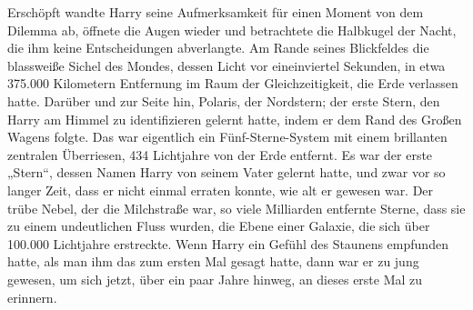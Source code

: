 Erschöpft wandte Harry seine Aufmerksamkeit für einen Moment von dem Dilemma ab, öffnete die Augen wieder und betrachtete die Halbkugel der Nacht, die ihm keine Entscheidungen abverlangte.
Am Rande seines Blickfeldes die blassweiße Sichel des Mondes, dessen Licht vor eineinviertel Sekunden, in etwa 375.000 Kilometern Entfernung im Raum der Gleichzeitigkeit, die Erde verlassen hatte.
Darüber und zur Seite hin, Polaris, der Nordstern; der erste Stern, den Harry am Himmel zu identifizieren gelernt hatte, indem er dem Rand des Großen Wagens folgte. Das war eigentlich ein Fünf-Sterne-System mit einem brillanten zentralen Überriesen, 434 Lichtjahre von der Erde entfernt. Es war der erste „Stern“, dessen Namen Harry von seinem Vater gelernt hatte, und zwar vor so langer Zeit, dass er nicht einmal erraten konnte, wie alt er gewesen war.
Der trübe Nebel, der die Milchstraße war, so viele Milliarden entfernte Sterne, dass sie zu einem undeutlichen Fluss wurden, die Ebene einer Galaxie, die sich über 100.000 Lichtjahre erstreckte. Wenn Harry ein Gefühl des Staunens empfunden hatte, als man ihm das zum ersten Mal gesagt hatte, dann war er zu jung gewesen, um sich jetzt, über ein paar Jahre hinweg, an dieses erste Mal zu erinnern.

